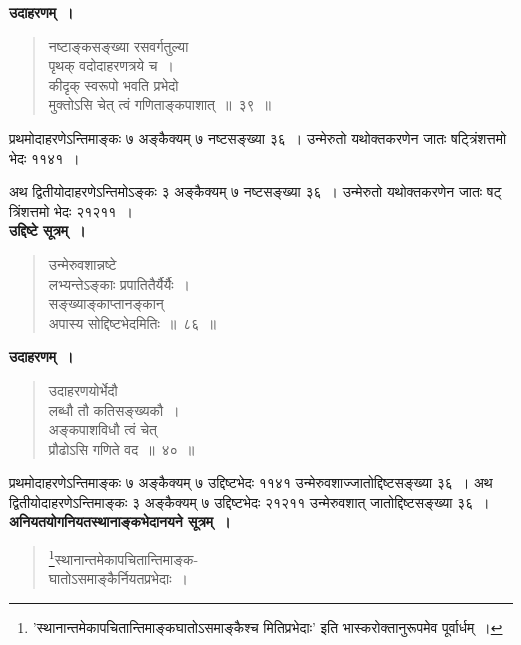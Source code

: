 \documentclass[11pt, openany]{book}
\begin{document}
\textbf{उदाहरणम्~।}

\begin{quote}
{\ex नष्टाङ्कसङ्ख्या रसवर्गतुल्या\\
पृथक् वदोदाहरणत्रये च~।\\
कीदृक् स्वरूपो भवति प्रभेदो\\
मुक्तोऽसि चेत् त्वं गणिताङ्कपाशात्~॥~३९~॥}
\end{quote}

प्रथमोदाहरणेऽन्तिमाङ्कः ७ अङ्कैक्यम् ७ नष्टसङ्ख्या ३६~। उन्मेरुतो यथोक्तकरणेन जातः षट्त्रिंशत्तमो भेदः ११४१~।

\newpage

अथ द्वितीयोदाहरणेऽन्तिमोऽङ्कः ३ अङ्कैक्यम् ७ नष्टसङ्ख्या ३६~। उन्मेरुतो यथोक्तकरणेन जातः षट् त्रिंशत्तमो भेदः २१२११~।\\

\textbf{उद्दिष्टे सूत्रम्~।}

\begin{quote}
{\gk उन्मेरुवशान्नष्टे\\
लभ्यन्तेऽङ्काः प्रपातितैर्यैर्यैः~।\\
सङ्ख्याङ्काप्तानङ्कान्\\
अपास्य सोद्दिष्टभेदमितिः~॥~८६~॥	}
\end{quote}

\textbf{उदाहरणम्~।}

\begin{quote}
{\ex उदाहरणयोर्भेदौ\\
लब्धौ तौ कतिसङ्ख्यकौ~।\\
अङ्कपाशविधौ त्वं चेत्\\
प्रौढोऽसि गणिते वद~॥~४०~॥	}
\end{quote}

प्रथमोदाहरणेऽन्तिमाङ्कः ७ अङ्कैक्यम् ७ उद्दिष्टभेदः ११४१ उन्मेरुवशाज्जातोद्दिष्टसङ्ख्या ३६~। अथ द्वितीयोदाहरणेऽन्तिमाङ्कः ३ अङ्कैक्यम् ७ उद्दिष्टभेदः २१२११ उन्मेरुवशात् जातोद्दिष्टसङ्ख्या ३६~। \\

\textbf{अनियतयोगनियतस्थानाङ्कभेदानयने सूत्रम्~।}

 \label{13.87.1}
\begin{quote}
\renewcommand{\thefootnote}{१}\footnote{{\qt 'स्थानान्तमेकापचितान्तिमाङ्कघातोऽसमाङ्कैश्च मितिप्रभेदाः'} इति {\qt भास्करो}क्तानुरूपमेव पूर्वार्धम्~।}{\gk स्थानान्तमेकापचितान्तिमाङ्क-\\
घातोऽसमाङ्कैर्नियतप्रभेदाः~।}
\end{quote}

\newpage
\end{document}
